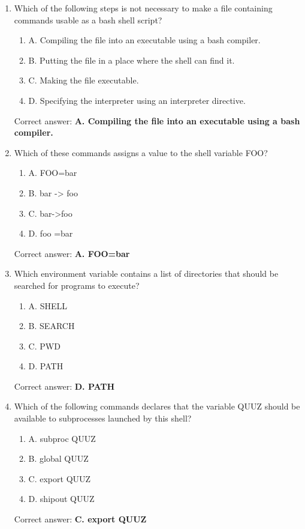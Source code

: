 \documentclass{article}
\begin{document}
\begin{enumerate}
    \item Which of the following steps is not necessary to make a file containing commands usable as a bash shell script?
    \begin{enumerate}
        \item A. Compiling the file into an executable using a bash compiler.
        \item B. Putting the file in a place where the shell can find it.
        \item C. Making the file executable.
        \item D. Specifying the interpreter using an interpreter directive.
    \end{enumerate}
    Correct answer: \textbf{A. Compiling the file into an executable using a bash compiler.}

    \item Which of these commands assigns a value to the shell variable FOO?
    \begin{enumerate}
        \item A. FOO=bar
        \item B. bar -> foo
        \item C. bar->foo
        \item D. foo =bar
    \end{enumerate}
    Correct answer: \textbf{A. FOO=bar}

    \item Which environment variable contains a list of directories that should be searched for programs to execute?
    \begin{enumerate}
        \item A. SHELL
        \item B. SEARCH
        \item C. PWD
        \item D. PATH
    \end{enumerate}
    Correct answer: \textbf{D. PATH}

    \item Which of the following commands declares that the variable QUUZ should be available to subprocesses launched by this shell?
    \begin{enumerate}
        \item A. subproc QUUZ
        \item B. global QUUZ
        \item C. export QUUZ
        \item D. shipout QUUZ
    \end{enumerate}
    Correct answer: \textbf{C. export QUUZ}


\end{enumerate}
\end{document}
